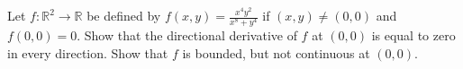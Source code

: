 Let $f:\mathbb R^2\to\mathbb R$ be defined by $f(x,y)=\frac{x^4y^2}{x^8+y^4}$ if $(x,y)\ne(0,0)$ and $f(0,0)=0$. Show that the directional derivative of $f$ at $(0,0)$ is equal to zero in every direction. Show that $f$ is bounded, but not continuous at $(0,0)$.
